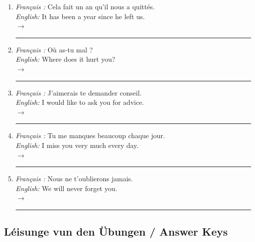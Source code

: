 \begin{enumerate}
    \item \textit{Français :} Cela fait un an qu'il nous a quittés. \\
    \textit{English:} It has been a year since he left us. \\
    $\rightarrow$ \rule{10cm}{0.4pt}

    \item \textit{Français :} Où as-tu mal ? \\
    \textit{English:} Where does it hurt you? \\
    $\rightarrow$ \rule{10cm}{0.4pt}

    \item \textit{Français :} J'aimerais te demander conseil. \\
    \textit{English:} I would like to ask you for advice. \\
    $\rightarrow$ \rule{10cm}{0.4pt}

    \item \textit{Français :} Tu me manques beaucoup chaque jour. \\
    \textit{English:} I miss you very much every day. \\
    $\rightarrow$ \rule{10cm}{0.4pt}

    \item \textit{Français :} Nous ne t'oublierons jamais. \\
    \textit{English:} We will never forget you. \\
    $\rightarrow$ \rule{10cm}{0.4pt}
\end{enumerate}

\vspace{1.5em}

\subsection*{Léisunge vun den Übungen / Answer Keys}

